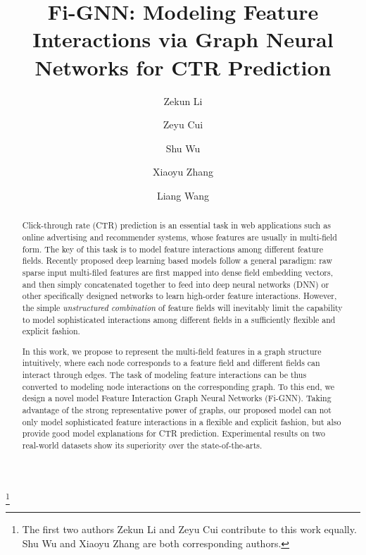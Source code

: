 \documentclass[sigconf]{acmart}
\begin{document}
\fancyhead{}


\title{Fi-GNN: Modeling Feature Interactions via Graph Neural Networks for CTR Prediction}




\author{Zekun Li}
\author{Zeyu Cui}
\author{Shu Wu}
\author{Xiaoyu Zhang}
\author{Liang Wang}
\thanks{The first two authors Zekun Li and Zeyu Cui contribute to this work equally.
Shu Wu and Xiaoyu Zhang are both corresponding authors.}


\renewcommand{\shortauthors}{Li and Cui, et al.}

\begin{abstract}
Click-through rate (CTR) prediction is an essential task in web applications such as online advertising and recommender systems, whose features are usually in multi-field form.
The key of this task is to model feature interactions among different feature fields.
Recently proposed deep learning based models follow a general paradigm: raw sparse input multi-filed features are first mapped into dense field embedding vectors, and then simply concatenated together to feed into deep neural networks (DNN) or other specifically designed networks to learn high-order feature interactions. 
However, the simple \emph{unstructured combination} of feature fields will inevitably limit the capability to model sophisticated interactions among different fields in a sufficiently flexible and explicit fashion.

In this work, we propose to represent the multi-field features in a graph structure intuitively, where each node corresponds to a feature field and different fields can interact through edges.  
The task of modeling feature interactions can be thus converted to modeling node interactions on the corresponding graph.
To this end, we design a novel model Feature Interaction Graph Neural Networks (Fi-GNN).
Taking advantage of the strong representative power of graphs, our proposed model can not only model sophisticated feature interactions in a flexible and explicit fashion, but also provide good model explanations for CTR prediction.
Experimental results on two real-world datasets show its superiority over the state-of-the-arts.
\end{abstract}
\end{document}

